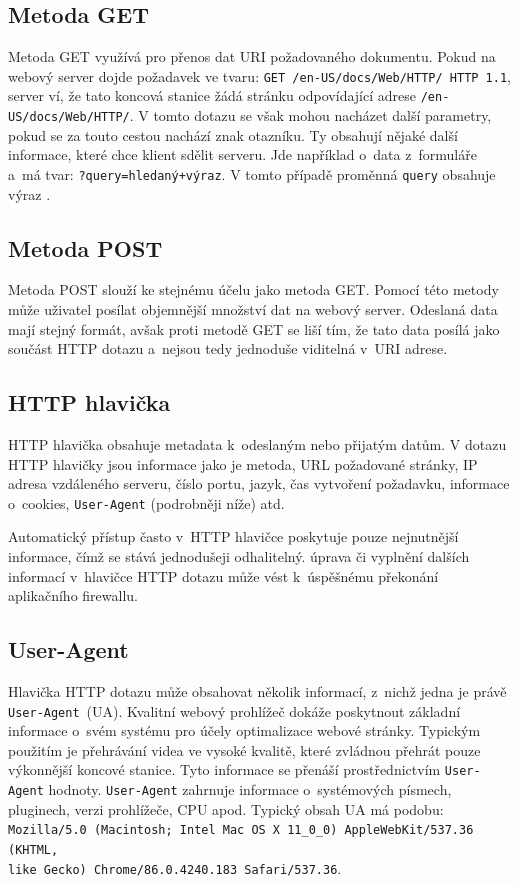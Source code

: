 \subsection*{Metoda GET}
Metoda GET využívá pro přenos dat URI požadovaného dokumentu. Pokud na webový server dojde požadavek ve tvaru: \texttt{GET /en-US/docs/Web/HTTP/ HTTP 1.1}, server ví, že tato koncová stanice žádá stránku odpovídající adrese \texttt{/en-US/docs/Web/HTTP/}. V tomto dotazu se však mohou nacházet další parametry, pokud se za touto cestou nachází znak otazníku. Ty obsahují nějaké další informace, které chce klient sdělit serveru. Jde například o~data z~formuláře a~má tvar: \texttt{?query=hledaný+výraz}. V tomto případě proměnná \texttt{query} obsahuje výraz .

\subsection*{Metoda POST}
Metoda POST slouží ke stejnému účelu jako metoda GET. Pomocí této metody může uživatel posílat objemnější množství dat na webový server. Odeslaná data mají stejný formát, avšak proti metodě GET se liší tím, že tato data posílá jako součást HTTP dotazu a~nejsou tedy jednoduše viditelná v~URI adrese. 

\subsection*{HTTP hlavička}
HTTP hlavička obsahuje metadata k~odeslaným nebo přijatým datům. V dotazu HTTP hlavičky jsou informace jako je metoda, URL požadované stránky, IP adresa vzdáleného serveru, číslo portu, jazyk, čas vytvoření požadavku, informace o~cookies, \texttt{User-Agent} (podrobněji níže) atd.

Automatický přístup často v~HTTP hlavičce poskytuje pouze nejnutnější informace, čímž se stává jednodušeji odhalitelný.  úprava či vyplnění dalších informací v~hlavičce HTTP dotazu může vést k~úspěšnému překonání aplikačního firewallu.

\subsection*{User-Agent}
\label{sec:user_agent}
Hlavička HTTP dotazu může obsahovat několik informací, z~nichž jedna je právě \texttt{User-Agent}~(UA). Kvalitní webový prohlížeč dokáže poskytnout základní informace o~svém systému pro účely optimalizace webové stránky. Typickým použitím je přehrávání videa ve vysoké kvalitě, které zvládnou přehrát pouze výkonnější koncové stanice. Tyto informace se přenáší prostřednictvím \texttt{User-Agent} hodnoty. \texttt{User-Agent} zahrnuje informace o~systémových písmech, pluginech, verzi prohlížeče, CPU apod. Typický obsah UA má podobu: \texttt{Mozilla/5.0 (Macintosh; Intel Mac OS X 11\_0\_0) AppleWebKit/537.36 (KHTML,
\\
like Gecko) Chrome/86.0.4240.183 Safari/537.36}.

